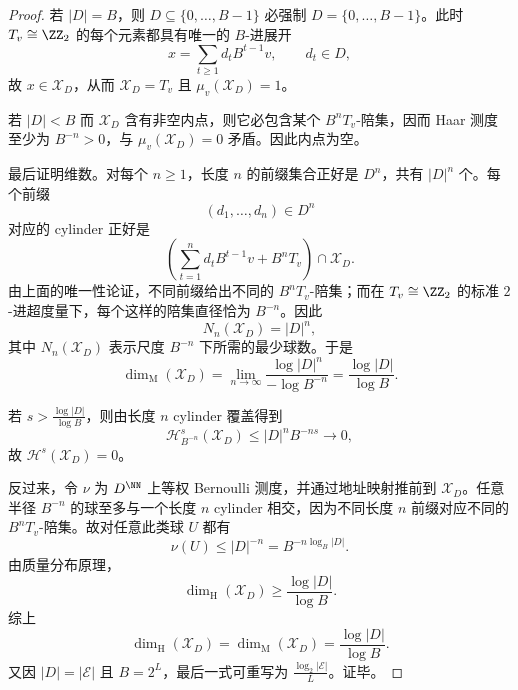 \begin{proof}
若 \(|D|=B\)，则 \(D\subseteq\{0,\dots,B-1\}\) 必强制 \(D=\{0,\dots,B-1\}\)。此时 \(T_v\cong\ZZ_2\) 的每个元素都具有唯一的 \(B\)-进展开
\[
x=\sum_{t\ge 1}d_t B^{t-1}v,
\qquad
d_t\in D,
\]
故 \(x\in \mathcal X_D\)，从而 \(\mathcal X_D=T_v\) 且 \(\mu_v(\mathcal X_D)=1\)。

若 \(|D|<B\) 而 \(\mathcal X_D\) 含有非空内点，则它必包含某个 \(B^nT_v\)-陪集，因而 Haar 测度至少为 \(B^{-n}>0\)，与 \(\mu_v(\mathcal X_D)=0\) 矛盾。因此内点为空。

最后证明维数。对每个 \(n\ge 1\)，长度 \(n\) 的前缀集合正好是 \(D^n\)，共有 \(|D|^n\) 个。每个前缀
\[
(d_1,\dots,d_n)\in D^n
\]
对应的 cylinder 正好是
\[
\left(\sum_{t=1}^{n}d_tB^{t-1}v+B^nT_v\right)\cap \mathcal X_D.
\]
由上面的唯一性论证，不同前缀给出不同的 \(B^nT_v\)-陪集；而在 \(T_v\cong \ZZ_2\) 的标准 \(2\)-进超度量下，每个这样的陪集直径恰为 \(B^{-n}\)。因此
\[
N_n(\mathcal X_D)=|D|^n,
\]
其中 \(N_n(\mathcal X_D)\) 表示尺度 \(B^{-n}\) 下所需的最少球数。于是
\[
\dim_{\mathrm M}(\mathcal X_D)
=
\lim_{n\to\infty}\frac{\log |D|^n}{-\log B^{-n}}
=
\frac{\log |D|}{\log B}.
\]

若 \(s>\frac{\log |D|}{\log B}\)，则由长度 \(n\) cylinder 覆盖得到
\[
\mathcal H^s_{B^{-n}}(\mathcal X_D)
\le
|D|^nB^{-ns}
\longrightarrow 0,
\]
故 \(\mathcal H^s(\mathcal X_D)=0\)。

反过来，令 \(\nu\) 为 \(D^\NN\) 上等权 Bernoulli 测度，并通过地址映射推前到 \(\mathcal X_D\)。任意半径 \(B^{-n}\) 的球至多与一个长度 \(n\) cylinder 相交，因为不同长度 \(n\) 前缀对应不同的 \(B^nT_v\)-陪集。故对任意此类球 \(U\) 都有
\[
\nu(U)\le |D|^{-n}=B^{-n\log_B|D|}.
\]
由质量分布原理，
\[
\dim_{\mathrm H}(\mathcal X_D)\ge \frac{\log |D|}{\log B}.
\]
综上
\[
\dim_{\mathrm H}(\mathcal X_D)=\dim_{\mathrm M}(\mathcal X_D)=\frac{\log |D|}{\log B}.
\]
又因 \(|D|=|\mathcal E|\) 且 \(B=2^L\)，最后一式可重写为 \(\frac{\log_2|\mathcal E|}{L}\)。证毕。
\end{proof}


